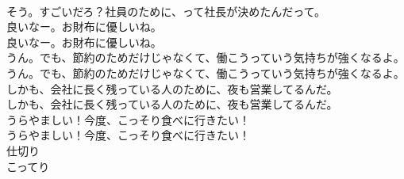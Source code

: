 \documentclass[8pt]{extreport}
\begin{document}
\begin{CJK}{UTF8}{min}
\\	そう。すごいだろ？社員のために、って社長が決めたんだって。 
\\	良いなー。お財布に優しいね。	
\\	良いなー。お財布に優しいね。 
\\	うん。でも、節約のためだけじゃなくて、働こうっていう気持ちが強くなるよ。	
\\	うん。でも、節約のためだけじゃなくて、働こうっていう気持ちが強くなるよ。 
\\	しかも、会社に長く残っている人のために、夜も営業してるんだ。	
\\	しかも、会社に長く残っている人のために、夜も営業してるんだ。 
\\	うらやましい！今度、こっそり食べに行きたい！	
\\	うらやましい！今度、こっそり食べに行きたい！ 
\\	仕切り
\\	こってり
\end{CJK}
\end{document}

